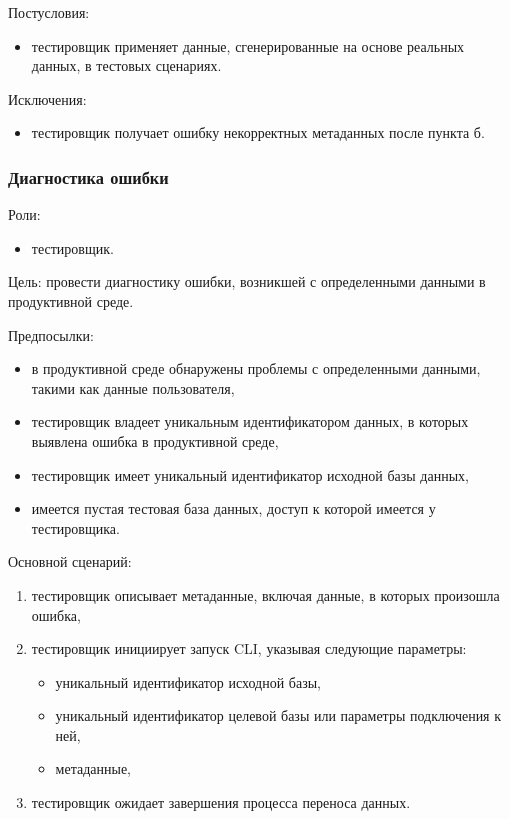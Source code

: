 Постусловия:

\begin{itemize}
    \item тестировщик применяет данные, сгенерированные на основе реальных данных, в тестовых сценариях.
\end{itemize}

Исключения:

\begin{itemize}
    \item тестировщик получает ошибку некорректных метаданных после пункта б.
\end{itemize}


\subsubsection{Диагностика ошибки}

Роли:

\begin{itemize}
    \item тестировщик.
\end{itemize}

Цель: провести диагностику ошибки, возникшей с определенными данными в продуктивной среде.

Предпосылки:

\begin{itemize}
    \item в продуктивной среде обнаружены проблемы с определенными данными, такими как данные пользователя,
    \item тестировщик владеет уникальным идентификатором данных, в которых выявлена ошибка в продуктивной среде,
    \item тестировщик имеет уникальный идентификатор исходной базы данных,
    \item имеется пустая тестовая база данных, доступ к которой имеется у тестировщика.
\end{itemize}

Основной сценарий:

\begin{enumerate}
    \item тестировщик описывает метаданные, включая данные, в которых произошла ошибка,
    \item тестировщик инициирует запуск CLI, указывая следующие параметры:
    \begin{itemize}
        \item уникальный идентификатор исходной базы,
        \item уникальный идентификатор целевой базы или параметры подключения к ней,
        \item метаданные,
    \end{itemize}
    \item тестировщик ожидает завершения процесса переноса данных.
\end{enumerate}

